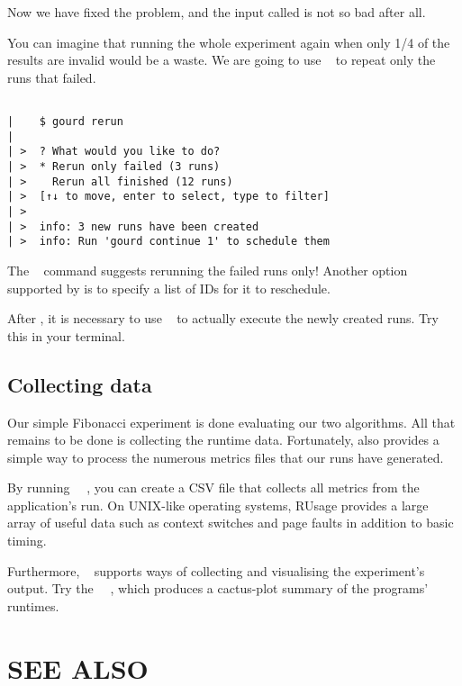 \documentclass[a4paper,english]{article}
\begin{document}
\begin{adjustwidth}{18pt}{0pt}
\begin{verbatim}
    \end{verbatim}

    Now we have fixed the problem, and the input called  is not
    so bad after all.

    You can imagine that running the whole experiment again when only 1/4 of the results are invalid would be a waste.
    We are going to use ~ to repeat only the runs that failed.

    \begin{verbatim}

|    $ gourd rerun
|
| >  ? What would you like to do?
| >  * Rerun only failed (3 runs)
| >    Rerun all finished (12 runs)
| >  [↑↓ to move, enter to select, type to filter]
| >
| >  info: 3 new runs have been created
| >  info: Run 'gourd continue 1' to schedule them

    \end{verbatim}

    The ~ command suggests rerunning the failed runs only!
    Another option supported by  is to specify a list of IDs for it to reschedule.

    After , it is necessary to use ~ to actually execute the newly created runs.
    Try this in your terminal.

    \subsection{Collecting data}

    Our simple Fibonacci experiment is done evaluating our two algorithms. All
    that remains to be done is collecting the runtime data. Fortunately,
     also provides a simple way to process the numerous metrics
    files that our runs have generated.

    By running ~~, you can create a CSV
    file that collects all metrics from the application's run.
    On UNIX-like operating systems, RUsage provides a large array of useful
    data such as context switches and page faults in addition to basic timing.

    Furthermore, ~ supports
    ways of collecting and visualising the experiment's output.
    Try the ~~, which produces a cactus-plot summary
    of the programs' runtimes.

    \section{SEE ALSO}


\end{adjustwidth}
\end{document}
